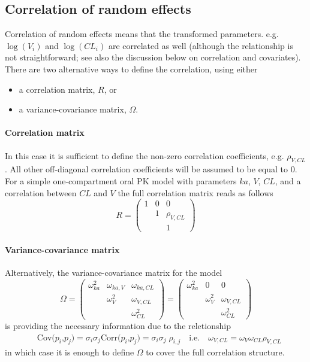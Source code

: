 \subsection{Correlation of random effects}
\label{subsec:correlationModel}\label{maths:param correlation}
Correlation of random effects means that the transformed parameters. e.g. $\log(V_i)$ and $\log(CL_i)$ are correlated as well (although the relationship is not straightforward; see also the discussion below on correlation and covariates). There are two alternative ways to define the correlation, using either
\begin{itemize}
\item
a correlation matrix, $R$, or
\item
a variance-covariance matrix, $\Omega$.
\end{itemize}


\paragraph{Correlation matrix}
In this case it is sufficient to define the non-zero correlation coefficients, e.g. $\rho_{V,CL}$. All other off-diagonal correlation coefficients will be assumed to be equal to 0. For a simple one-compartment oral PK model with parameters $ka$, $V$, $CL$, and a correlation between $CL$ and $V$ the full correlation matrix reads as follows
\[
R =
 \begin{pmatrix}
  1 	& 0 	& 0  	\\
   		& 1	& \rho_{V,CL} \\
  		& 	& 1
 \end{pmatrix}
\]

\paragraph{Variance-covariance matrix}
\label{maths:covariance-mat-derivation}
Alternatively, the variance-covariance matrix for the model
\[
 \Omega =
 \begin{pmatrix}
  \omega_{ka}^2 	& \omega_{ka,V}	& \omega_{ka,CL}\\
   			  	& \omega_{V}^2	& \omega_{V,CL} \\
  				& 				& \omega_{CL}^2
 \end{pmatrix}
 =
  \begin{pmatrix}
  \omega_{ka}^2 	& 0				& 0 \\
   			  	& \omega_{V}^2	& \omega_{V,CL} \\
  				& 				& \omega_{CL}^2
 \end{pmatrix}
\]
is providing the necessary information due to the reletionship
\begin{align*}
	&\mbox{Cov($p_i$,$p_j$)} = \sigma_i \sigma_j \mbox{Corr($p_i$,$p_j$)}  = \sigma_i \sigma_j \;\rho_{i,j} \quad \mbox{i.e.} \quad \omega_{V,CL} = \omega_V \omega_{CL} \rho_{V,CL}
\end{align*}
in which case it is enough to define $\Omega$ to cover the full correlation structure.

